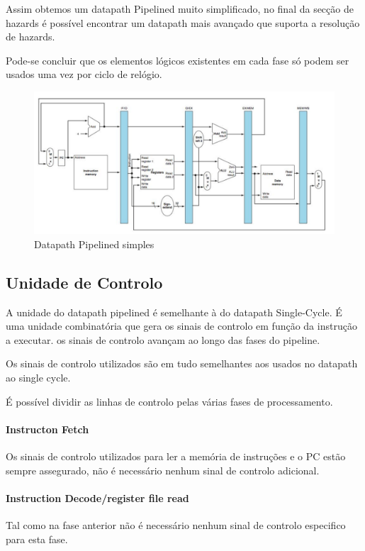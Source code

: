 \documentclass[10pt,a4paper]{book}
\begin{document}
			Assim obtemos um datapath Pipelined muito simplificado, no final da secção de hazards é possível encontrar um datapath mais avançado que suporta a resolução de hazards.

			Pode-se concluir que os elementos lógicos existentes em cada fase só podem ser usados uma vez por ciclo de relógio.

			\begin{figure}[htp]
					\centering
					\includegraphics[scale=0.3]{pipeline4.png}
					\caption{Datapath Pipelined simples}
					\label{simple-pipelined}
			\end{figure}


		\subsection{Unidade de Controlo}

		A unidade do datapath pipelined é semelhante à do datapath Single-Cycle. É uma unidade combinatória que gera os sinais de controlo em função da instrução a executar.
		os sinais de controlo avançam ao longo das fases do pipeline.

		Os sinais de controlo utilizados são em tudo semelhantes aos usados no datapath ao single cycle.

		É possível dividir as linhas de controlo pelas várias fases de processamento.

		\paragraph{Instructon Fetch} Os sinais de controlo utilizados para ler a memória de instruções e o PC estão sempre assegurado, não é necessário nenhum sinal de controlo adicional.

		\paragraph{Instruction Decode/register file read} Tal como na fase anterior não é necessário nenhum sinal de controlo especifico para esta fase.
\end{document}
